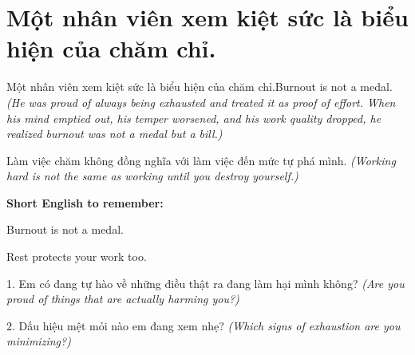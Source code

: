 \section{Một nhân viên xem kiệt sức là biểu hiện của chăm chỉ.}
\begin{truyen}{Một nhân viên xem kiệt sức là biểu hiện của chăm chỉ.}{Burnout is not a medal.}
\textit{(He was proud of always being exhausted and treated it as proof of effort. When his mind emptied out, his temper worsened, and his work quality dropped, he realized burnout was not a medal but a bill.)}
\end{truyen}
\begin{baihoc}
Làm việc chăm không đồng nghĩa với làm việc đến mức tự phá mình.
\textit{(Working hard is not the same as working until you destroy yourself.)}
\end{baihoc}
\begin{ghinhoanh}
\textbf{Short English to remember:}

Burnout is not a medal.

Rest protects your work too.
\end{ghinhoanh}
\begin{tuhocnhanh}
1. Em có đang tự hào về những điều thật ra đang làm hại mình không? \textit{(Are you proud of things that are actually harming you?)}

2. Dấu hiệu mệt mỏi nào em đang xem nhẹ? \textit{(Which signs of exhaustion are you minimizing?)}
\end{tuhocnhanh}
\ngancach


